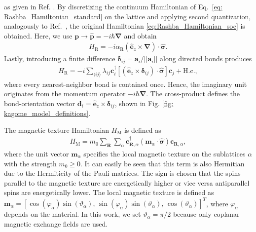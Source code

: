 as given in Ref. \cite{Bychkov1984OscillatoryEA}.
By discretizing the continuum Hamiltonian of Eq.~\eqref{eq: Rashba_Hamiltonian_standard} on the lattice and applying second quantization, analogously to Ref.~\cite{PhysRevB.94.184402}, the original Hamiltonian \eqref{eq:Rashba_Hamiltonian_soc} is obtained. Here, we use $\mathbf{p}\to \hat{\mathbf{p}} = -i\hbar\bm{\nabla}$ and obtain 
\begin{align}
    H_\text{R} = -i\alpha_\text{R}(\mathbf{\hat{e}}_z \times \bm{\nabla})\cdot \bm{\hat{\sigma}}.
\end{align}
Lastly, introducing a finite difference $\bm{{\delta}}_{ij} = \mathbf{a}_i/||\mathbf{a}_i||$ along directed bonds produces 
\begin{align}
    H_\text{R} = -i \sum_{\langle ij\rangle} \lambda_{ij} \mathbf{c}_i^\dagger [(\bm{\hat{e}}_{z}\times \bm{{\delta}}_{ij}) \cdot \bm{\hat{\sigma}}] \mathbf{c}_j + \text{H.c.},
\end{align}
where every nearest-neighbor bond is contained once. Hence, the imaginary unit originates from the momentum operator $-i\hbar\bm{\nabla}$.  
The cross-product defines the bond-orientation vector $\mathbf{d}_i = \mathbf{\hat{e}}_z \times \bm{\delta}_{ij}$, shown in Fig. \ref{fig: kagome_model_definitions}. 

The magnetic texture Hamiltonian $H_\text{M}$ is defined as
\begin{align}
    H_\text{M} = m_0 \sum_\mathbf{R} \sum_\alpha \mathbf{c}_{\mathbf{R},\alpha}^\dagger \left( \mathbf{m}_\alpha\cdot \mathbf{\hat{\sigma}}\right) \mathbf{c}_{\mathbf{R},\alpha},
    \label{eq: hamiltonian magnetic texture}
\end{align}
where the unit vector $\mathbf{m}_\alpha$ specifies the local magnetic texture on the sublattices $\alpha$ with the strength $m_0\geq 0$. It can easily be seen that this term is also Hermitian due to the Hermiticity of the Pauli matrices. The sign is chosen that the spins parallel to the magnetic texture are energetically higher or vice versa antiparallel spins are energetically lower.
The local magnetic texture is defined as $\mathbf{m}_\alpha = \left[\cos(\varphi_\alpha)\sin(\vartheta_\alpha),\,\sin(\varphi_\alpha)\sin(\vartheta_\alpha), \,\cos(\vartheta_\alpha)\right]^T$, where $\varphi_\alpha$ depends on the material. In this work, we set $\vartheta_\alpha = \pi/2$ because only coplanar magnetic exchange fields are used.\\


